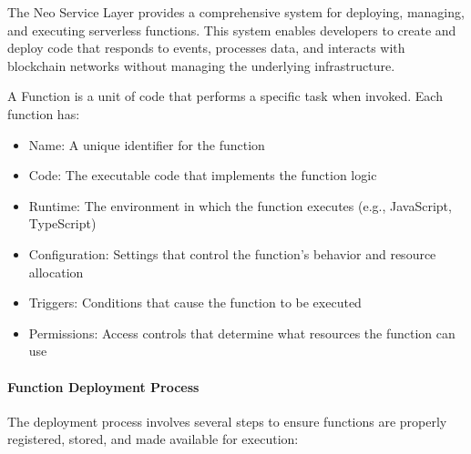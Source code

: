 The Neo Service Layer provides a comprehensive system for deploying, managing, and executing serverless functions. This system enables developers to create and deploy code that responds to events, processes data, and interacts with blockchain networks without managing the underlying infrastructure.



\begin{definition}[Function]
A Function is a unit of code that performs a specific task when invoked. Each function has:
\begin{itemize}
    \item Name: A unique identifier for the function
    \item Code: The executable code that implements the function logic
    \item Runtime: The environment in which the function executes (e.g., JavaScript, TypeScript)
    \item Configuration: Settings that control the function's behavior and resource allocation
    \item Triggers: Conditions that cause the function to be executed
    \item Permissions: Access controls that determine what resources the function can use
\end{itemize}
\end{definition}

\paragraph{Function Deployment Process}
The deployment process involves several steps to ensure functions are properly registered, stored, and made available for execution:

